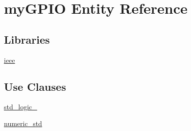 \hypertarget{classmy_g_p_i_o}{\section{my\+G\+P\+I\+O Entity Reference}
\label{classmy_g_p_i_o}
}
\subsection*{Libraries}
 \begin{DoxyCompactItemize}
\item 
\hypertarget{classmy_g_p_i_o_ga0a6af6eef40212dbaf130d57ce711256}{\hyperlink{group___a_x_i-device_ga0a6af6eef40212dbaf130d57ce711256}{ieee} }\label{classmy_g_p_i_o_ga0a6af6eef40212dbaf130d57ce711256}

\end{DoxyCompactItemize}
\subsection*{Use Clauses}
 \begin{DoxyCompactItemize}
\item 
\hypertarget{classmy_g_p_i_o_gacd03516902501cd1c7296a98e22c6fcb}{\hyperlink{group___a_x_i-device_gacd03516902501cd1c7296a98e22c6fcb}{std\+\_\+logic\+\_}   }\label{classmy_g_p_i_o_gacd03516902501cd1c7296a98e22c6fcb}

\item 
\hypertarget{classmy_g_p_i_o_ga2edc34402b573437d5f25fa90ba4013e}{\hyperlink{group___a_x_i-device_ga2edc34402b573437d5f25fa90ba4013e}{numeric\+\_\+std}   }\label{classmy_g_p_i_o_ga2edc34402b573437d5f25fa90ba4013e}

\end{DoxyCompactItemize}

